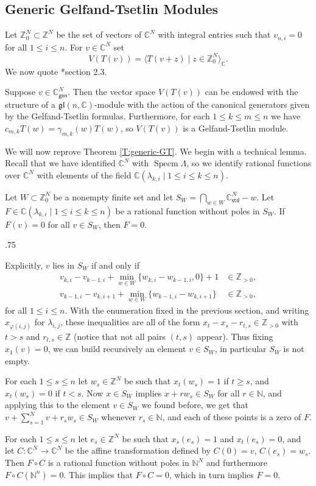\documentclass[11pt,fleqn]{article}
\makeatletter
\renewenvironment{proof}[1][\textit{Proof}]{\par
  \pushQED{\qed}%
  \normalfont \topsep.75\paraskip\relax
  \trivlist
  \item[\hskip\labelsep
        \itshape
    #1\@addpunct{.}]\ignorespaces
}{%
  \popQED\endtrivlist\@endpefalse
}
\newcommand\NN{\mathbb N}
\newcommand\CC{\mathbb C}
\newcommand\ZZ{\mathbb Z}
\renewcommand\to{\longrightarrow}
\renewcommand\phi{\varphi}
\newcommand\gl{\mathfrak{gl}}
\newcommand\gen{\mathsf{gen}}
\newcommand\std{\mathsf{std}}
\DeclareMathOperator\Specm{Specm}
\makeatother
\begin{document}
\subsection{Generic Gelfand-Tsetlin Modules}
Let $\ZZ_0^N \subset \ZZ^N$ be the set of vectors of $\CC^N$ with integral 
entries such that $v_{n,i} = 0$ for all $1 \leq i \leq n$. For $v \in \CC^N$
set 
\[
	V(T(v)) = \langle T(v+z) \mid z \in \ZZ^N_0 \rangle_\CC.
\]
We now quote \cite{DFO-GT-modules}*{section 2.3}.
\begin{Theorem}
\label{T:generic-GT}
Suppose $v \in \CC_\gen^N$. Then the vector space $V(T(v))$ can be endowed 
with the structure of a $\gl(n,\CC)$-module with the action of the canonical 
generators given by the Gelfand-Tsetlin formulas. Furthermore, for each $1 
\leq k \leq m \leq n$ we have $c_{m,k} T(w) = \gamma_{m,k}(w) T(w)$, so 
$V(T(v))$ is a Gelfand-Tsetlin module.
\end{Theorem}

We will now reprove Theorem \ref{T:generic-GT}. We begin with a technical 
lemma. Recall that we have identified $\CC^N$ with $\Specm \Lambda$, so
we identify rational functions over $\CC^N$ with elements of the field
$\CC(\lambda_{k,i} \mid 1 \leq i \leq k \leq n)$.
\begin{Lemma}
\label{L:rational-zeroes}
Let $W \subset \ZZ^N_0$ be a nonempty finite set and let $S_W = \bigcap_{w \in 
W} \CC^N_\std - w$. Let $F \in \CC(\lambda_{k,i} \mid 1 \leq i \leq k \leq n)$ 
be a rational function without poles in $S_W$. If $F(v) = 0$ for all $v \in 
S_W$, then $F = 0$.
\end{Lemma}
\begin{proof}
Explicitly, $v$ lies in $S_W$ if and only if
\begin{align*}
v_{k,i} - v_{k-1,i} + \min_{w \in W}\{w_{k,i} - w_{k-1,i}, 0\} + 1 
	&\in \ZZ_{> 0}, \\
v_{k-1,i} - v_{k,i+1} + \min_{w \in W}\{w_{k-1,i} - w_{k,i+1}\}
	&\in \ZZ_{>0},
\end{align*}
for all $1 \leq i \leq n$. With the enumeration fixed in the previous section,
and writing $x_{\phi(i,j)}$ for $\lambda_{i,j}$, these inequalities are all of 
the form $x_t - x_s - r_{t,s} \in \ZZ_{>0}$ with $t > s$ and $r_{t,s} \in \ZZ$ 
(notice that not all pairs $(t,s)$ appear). Thus fixing $x_1(v) = 0$, we can 
build recursively an element $v \in S_W$, in particular $S_W$ is not empty.

For each $1 \leq s \leq n$ let $w_s \in \ZZ^N$ be such that $x_t(w_s) = 1$ if 
$t \geq s$, and $x_t(w_s) = 0$ if $t < s$. Now $x \in S_W$ implies $x + r w_s 
\in S_W$ for all $r \in \NN$, and applying this to the element $v \in S_W$ we 
found before, we get that $v + \sum_{s=1}^N v + r_s w_s \in S_W$ whenever $r_s 
\in \NN$, and each of these points is a zero of $F$.

For each $1 \leq s \leq n$ let $e_s \in \ZZ^N$ be such that $x_s(e_s) = 1$
and $x_t(e_s) = 0$, and let $C: \CC^N \to \CC^N$ be the affine transformation
defined by $C(0) = v$, $C(e_s) = w_s$. Then $F \circ C$ is a rational function
without poles in $\NN^N$ and furthermore $F \circ C(\NN^n) = 0$. This implies
that $F \circ C = 0$, which in turn implies $F = 0$.
\end{proof}
\end{document}
